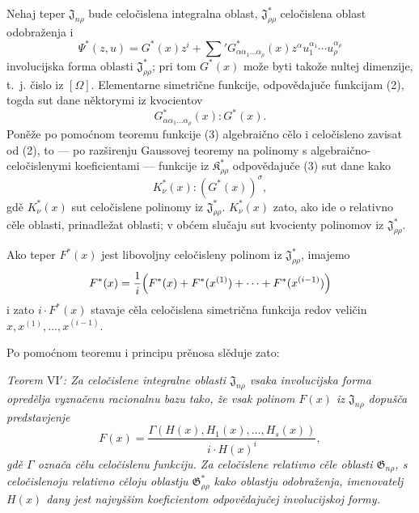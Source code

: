 \documentclass[11pt]{article}
\providecommand{\Kfield}{\mathfrak{K}}
\providecommand{\Jdom}{\mathfrak{J}}
\providecommand{\Gdom}{\mathfrak{G}}
\begin{document}
Nehaj teper $\Jdom_{n\rho}$ bude celočislena integralna oblast, $\Jdom^*_{\rho\rho}$ celočislena oblast odobraženja i
\[
  \Psi^*(z,u)=G^*(x)z^i+
  \sum{}'G^*_{\alpha\alpha_1\ldots\alpha_\rho}(x)
  z^\alpha u_1^{\alpha_1}\cdots u_\rho^{\alpha_\rho}
\]
involucijska forma oblasti $\Jdom^*_{\rho\rho}$; pri tom $G^*(x)$ može byti takože nultej dimenzije, t.~j. čislo iz $[\Omega]$. Elementarne simetrične funkcije, odpovědajuče funkcijam (2), togda sut dane něktorymi iz kvocientov
\begin{equation}
  G^*_{\alpha\alpha_1\ldots\alpha_\rho}(x):G^*(x).
\tag{4}
\end{equation}
Poněže po pomoćnom teoremu funkcije (3) algebraično cělo i celočisleno zavisat od (2), to --- po razširenju Gaussovej teoremy na polinomy s algebraično-celočislenymi koeficientami --- funkcije iz $\Kfield^*_{\rho\rho}$ odpovědajuče (3) sut dane kako
\begin{equation}
  K_\nu^*(x):(G^*(x))^\sigma,
\tag{5}
\end{equation}
gdě $K_\nu^*(x)$ sut celočislene polinomy iz $\Jdom^*_{\rho\rho}$. $K_\nu^*(x)$ zato, ako ide o relativno cěle oblasti, prinadležat oblasti; v obćem slučaju sut kvocienty polinomov iz $\Jdom^*_{\rho\rho}$.

Ako teper $F^*(x)$ jest libovoljny celočisleny polinom iz $\Jdom^*_{\rho\rho}$, imajemo
\[
  F^*(x)=\frac1i\Bigl(F^*(x)+F^*(x^{(1)})+\cdots+F^*(x^{(i-1)})\Bigr)
\]
i zato $i\cdot F^*(x)$ stavaje cěla celočislena simetrična funkcija redov veličin $x,x^{(1)},\ldots,x^{(i-1)}$.

Po pomoćnom teoremu i principu prěnosa slěduje zato:

{\itshape Teorem $\mathrm{VI}'$: Za celočislene integralne oblasti $\Jdom_{n\rho}$ vsaka involucijska forma opredělja vyznačenu racionalnu bazu tako, že vsak polinom $F(x)$ iz $\Jdom_{n\rho}$ dopušča predstavjenje}
\[
  F(x)=\frac{\Gamma(H(x),H_1(x),\ldots,H_s(x))}{i\cdot H(x)^i},
\]
{\itshape gdě $\Gamma$ označa cělu celočislenu funkciju. Za celočislene relativno cěle oblasti $\Gdom_{n\rho}$, s celočislenoju relativno cěloju oblastju $\Gdom^*_{\rho\rho}$ kako oblastju odobraženja, imenovatelj $H(x)$ dany jest najvyššim koeficientom odpovědajučej involucijskoj formy.}
\end{document}
